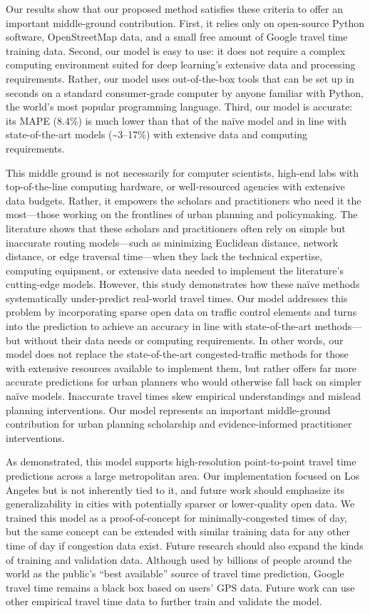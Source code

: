 \documentclass[12pt,letterpaper]{article} %
\begin{document}
Our results show that our proposed method satisfies these criteria to offer an important middle-ground contribution. First, it relies only on open-source Python software, OpenStreetMap data, and a small free amount of Google travel time training data. Second, our model is easy to use: it does not require a complex computing environment suited for deep learning's extensive data and processing requirements. Rather, our model uses out-of-the-box tools that can be set up in seconds on a standard consumer-grade computer by anyone familiar with Python, the world's most popular programming language. Third, our model is accurate: its MAPE (8.4\%) is much lower than that of the naïve model and in line with state-of-the-art models (\textasciitilde3--17\%) with extensive data and computing requirements.

This middle ground is not necessarily for computer scientists, high-end labs with top-of-the-line computing hardware, or well-resourced agencies with extensive data budgets. Rather, it empowers the scholars and practitioners who need it the most---those working on the frontlines of urban planning and policymaking. The literature shows that these scholars and practitioners often rely on simple but inaccurate routing models---such as minimizing Euclidean distance, network distance, or edge traversal time---when they lack the technical expertise, computing equipment, or extensive data needed to implement the literature's cutting-edge models. However, this study demonstrates how these naïve methods systematically under-predict real-world travel times. Our model addresses this problem by incorporating sparse open data on traffic control elements and turns into the prediction to achieve an accuracy in line with state-of-the-art methods---but without their data needs or computing requirements. In other words, our model does not replace the state-of-the-art congested-traffic methods for those with extensive resources available to implement them, but rather offers far more accurate predictions for urban planners who would otherwise fall back on simpler naïve models. Inaccurate travel times skew empirical understandings and mislead planning interventions. Our model represents an important middle-ground contribution for urban planning scholarship and evidence-informed practitioner interventions.

As demonstrated, this model supports high-resolution point-to-point travel time predictions across a large metropolitan area. Our implementation focused on Los Angeles but is not inherently tied to it, and future work should emphasize its generalizability in cities with potentially sparser or lower-quality open data. We trained this model as a proof-of-concept for minimally-congested times of day, but the same concept can be extended with similar training data for any other time of day if congestion data exist. Future research should also expand the kinds of training and validation data. Although used by billions of people around the world as the public's \enquote{best available} source of travel time prediction, Google travel time remains a black box based on users' GPS data. Future work can use other empirical travel time data to further train and validate the model.
\end{document}

